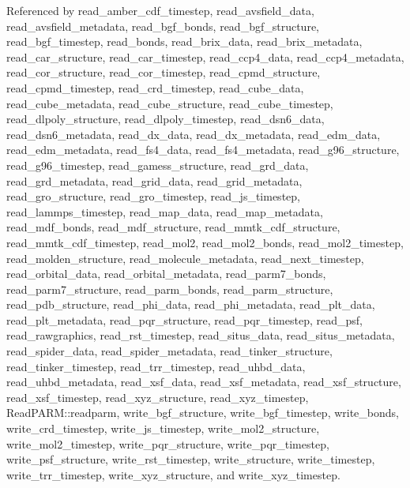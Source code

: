 Referenced by read\_\-amber\_\-cdf\_\-timestep, read\_\-avsfield\_\-data, read\_\-avsfield\_\-metadata, read\_\-bgf\_\-bonds, read\_\-bgf\_\-structure, read\_\-bgf\_\-timestep, read\_\-bonds, read\_\-brix\_\-data, read\_\-brix\_\-metadata, read\_\-car\_\-structure, read\_\-car\_\-timestep, read\_\-ccp4\_\-data, read\_\-ccp4\_\-metadata, read\_\-cor\_\-structure, read\_\-cor\_\-timestep, read\_\-cpmd\_\-structure, read\_\-cpmd\_\-timestep, read\_\-crd\_\-timestep, read\_\-cube\_\-data, read\_\-cube\_\-metadata, read\_\-cube\_\-structure, read\_\-cube\_\-timestep, read\_\-dlpoly\_\-structure, read\_\-dlpoly\_\-timestep, read\_\-dsn6\_\-data, read\_\-dsn6\_\-metadata, read\_\-dx\_\-data, read\_\-dx\_\-metadata, read\_\-edm\_\-data, read\_\-edm\_\-metadata, read\_\-fs4\_\-data, read\_\-fs4\_\-metadata, read\_\-g96\_\-structure, read\_\-g96\_\-timestep, read\_\-gamess\_\-structure, read\_\-grd\_\-data, read\_\-grd\_\-metadata, read\_\-grid\_\-data, read\_\-grid\_\-metadata, read\_\-gro\_\-structure, read\_\-gro\_\-timestep, read\_\-js\_\-timestep, read\_\-lammps\_\-timestep, read\_\-map\_\-data, read\_\-map\_\-metadata, read\_\-mdf\_\-bonds, read\_\-mdf\_\-structure, read\_\-mmtk\_\-cdf\_\-structure, read\_\-mmtk\_\-cdf\_\-timestep, read\_\-mol2, read\_\-mol2\_\-bonds, read\_\-mol2\_\-timestep, read\_\-molden\_\-structure, read\_\-molecule\_\-metadata, read\_\-next\_\-timestep, read\_\-orbital\_\-data, read\_\-orbital\_\-metadata, read\_\-parm7\_\-bonds, read\_\-parm7\_\-structure, read\_\-parm\_\-bonds, read\_\-parm\_\-structure, read\_\-pdb\_\-structure, read\_\-phi\_\-data, read\_\-phi\_\-metadata, read\_\-plt\_\-data, read\_\-plt\_\-metadata, read\_\-pqr\_\-structure, read\_\-pqr\_\-timestep, read\_\-psf, read\_\-rawgraphics, read\_\-rst\_\-timestep, read\_\-situs\_\-data, read\_\-situs\_\-metadata, read\_\-spider\_\-data, read\_\-spider\_\-metadata, read\_\-tinker\_\-structure, read\_\-tinker\_\-timestep, read\_\-trr\_\-timestep, read\_\-uhbd\_\-data, read\_\-uhbd\_\-metadata, read\_\-xsf\_\-data, read\_\-xsf\_\-metadata, read\_\-xsf\_\-structure, read\_\-xsf\_\-timestep, read\_\-xyz\_\-structure, read\_\-xyz\_\-timestep, Read\-PARM::readparm, write\_\-bgf\_\-structure, write\_\-bgf\_\-timestep, write\_\-bonds, write\_\-crd\_\-timestep, write\_\-js\_\-timestep, write\_\-mol2\_\-structure, write\_\-mol2\_\-timestep, write\_\-pqr\_\-structure, write\_\-pqr\_\-timestep, write\_\-psf\_\-structure, write\_\-rst\_\-timestep, write\_\-structure, write\_\-timestep, write\_\-trr\_\-timestep, write\_\-xyz\_\-structure, and write\_\-xyz\_\-timestep.

